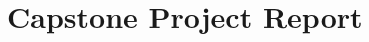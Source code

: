 \documentclass{notes}
\begin{document}
\section*{Capstone Project Report}



\nocite{*}


\end{document}
